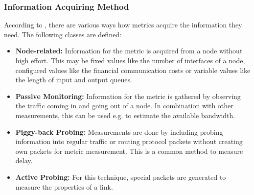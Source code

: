 \subsubsection{Information Acquiring Method} \label{subsec:txtInformationAcquiringMethod}
According to \cite{SurveyOnRoutingMetrics}, there are various ways how metrics acquire the information they need. The following classes are defined:
\begin{itemize}
    \item \textbf{Node-related:} Information for the metric is acquired from a node without high effort. This may be fixed values like the number of interfaces of a node, configured values like the financial communication costs or variable values like the length of input and output queues.
    \item \textbf{Passive Monitoring:} Information for the metric is gathered by observing the traffic coming in and going out of a node. In combination with other measurements, this can be used e.g. to estimate the available bandwidth.
    \item \textbf{Piggy-back Probing:}  Measurements are done by including probing information into regular traffic or routing protocol packets without creating own packets for metric measurement. This is a common method to measure delay.
    \item \textbf{Active Probing:} For this technique, special packets are generated to measure the properties of a link.
\end{itemize}
%
